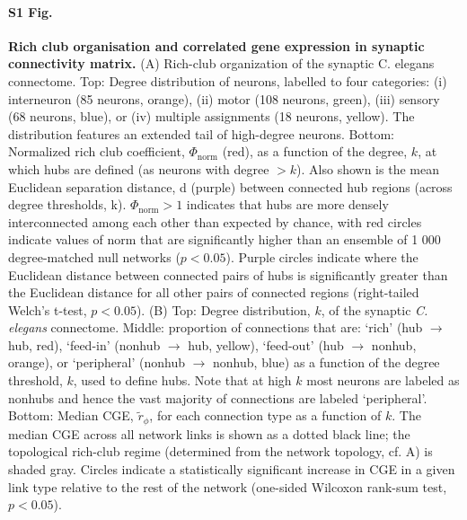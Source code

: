 \documentclass[10pt,letterpaper]{article}
\begin{document}
\paragraph*{S1 Fig.}
\label{S1_Fig}
{\bf Rich club organisation and correlated gene expression in synaptic connectivity matrix.}
(A) Rich-club organization of the synaptic C. elegans connectome.
Top: Degree distribution of neurons, labelled to four categories: (i) interneuron (85 neurons, orange), (ii) motor (108 neurons, green), (iii) sensory (68 neurons, blue), or (iv) multiple assignments (18 neurons, yellow).
The distribution features an extended tail of high-degree neurons. Bottom: Normalized rich club coefficient, $\Phi_\mathrm{norm}$ (red), as a function of the degree, $k$, at which hubs are defined (as neurons with degree $>k$).
Also shown is the mean Euclidean separation distance, d (purple) between connected hub regions (across degree thresholds, k). $\Phi_\mathrm{norm} > 1$ indicates that hubs are more densely interconnected among each other than expected by chance, with red circles indicate values of norm that are significantly higher than an ensemble of 1 000 degree-matched null networks ($p < 0.05$).
Purple circles indicate where the Euclidean distance between connected pairs of hubs is significantly greater than the Euclidean distance for all other pairs of connected regions (right-tailed Welch's t-test, $p < 0.05$).
(B) Top: Degree distribution, $k$, of the synaptic \textit{C. elegans}  connectome.
Middle: proportion of connections that are: `rich' (hub $\rightarrow$ hub, red), `feed-in' (nonhub $\rightarrow$ hub, yellow), `feed-out' (hub $\rightarrow$ nonhub, orange), or `peripheral' (nonhub $\rightarrow$ nonhub, blue) as a function of the degree threshold, $k$, used to define hubs.
Note that at high $k$ most neurons are labeled as nonhubs and hence the vast majority of connections are labeled `peripheral'.
Bottom: Median CGE, $\tilde{r}_\phi$, for each connection type as a function of $k$.
The median CGE across all network links is shown as a dotted black line; the topological rich-club regime (determined from the network topology, cf. A) is shaded gray.
Circles indicate a statistically significant increase in CGE in a given link type relative to the rest of the network (one-sided Wilcoxon rank-sum test, $p < 0.05$).
\end{document}
